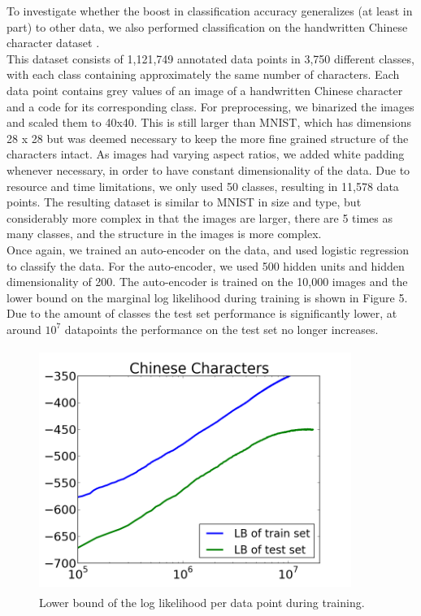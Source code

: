 \documentclass{article}
\begin{document}
To investigate whether the boost in classification accuracy generalizes (at least in part) to other data, we also performed classification on the handwritten Chinese character dataset \cite{liu2011casia}. \\
This dataset consists of 1,121,749 annotated data points in 3,750 different classes, with each class containing approximately the same number of characters. Each data point contains grey values of an image of a handwritten Chinese character and a code for its corresponding class. For preprocessing, we binarized the images and scaled them to 40x40. This is still larger than MNIST, which has dimensions 28 x 28 but was deemed necessary to keep the more fine grained structure of the characters intact. As images had varying aspect ratios, we added white padding whenever necessary, in order to have constant dimensionality of the data. Due to resource and time limitations, we only used 50 classes, resulting in 11,578 data points. The resulting dataset is similar to MNIST in size and type, but considerably more complex in that the images are larger, there are 5 times as many classes, and the structure in the images is more complex.\\
Once again, we trained an auto-encoder on the data, and used logistic regression to classify the data. For the auto-encoder, we used 500 hidden units and hidden dimensionality of 200. The auto-encoder is trained on the 10,000 images and the lower bound on the marginal log likelihood during training is shown in Figure 5. Due to the amount of classes the test set performance is significantly lower, at around $10^7$ datapoints the performance on the test set no longer increases.


\begin{figure}[htb]
\begin{center}
\includegraphics[height=3.1in,width=4in]{lowerboundchinese.png}
\caption{Lower bound of the log likelihood per data point during training.}
\end{center}
\end{figure}
\end{document}

